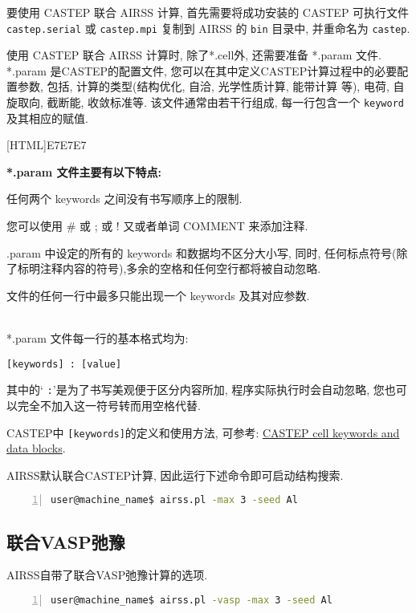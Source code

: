 \documentclass[a4paper, 10pt]{article}
\begin{document}
要使用 CASTEP 联合 AIRSS 计算, 首先需要将成功安装的 CASTEP 可执行文件 \verb|castep.serial| 或 \verb|castep.mpi| 复制到 AIRSS 的 \verb|bin| 目录中, 并重命名为 \verb|castep|.

使用 CASTEP 联合 AIRSS 计算时, 除了*.cell外, 还需要准备 *.param 文件. *.param 是CASTEP的配置文件, 您可以在其中定义CASTEP计算过程中的必要配置参数, 包括, 计算的类型(结构优化, 自洽, 光学性质计算, 能带计算 等), 电荷, 自旋取向, 截断能, 收敛标准等. 该文件通常由若干行组成, 每一行包含一个 \verb|keyword| 及其相应的赋值.

\noindent{}[HTML]{E7E7E7}{\parbox{\textwidth}{%
\noindent \textbf{*.param 文件主要有以下特点:}
\begin{maineu}
\item 任何两个 keywords 之间没有书写顺序上的限制.
\item 您可以使用 \# 或 ; 或 ! 又或者单词 COMMENT 来添加注释.
\item *.param 中设定的所有的 keywords 和数据均不区分大小写, 同时, 任何标点符号(除了标明注释内容的符号),多余的空格和任何空行都将被自动忽略.
\item 文件的任何一行中最多只能出现一个 keywords 及其对应参数.
\end{maineu}}}\\

*.param 文件每一行的基本格式均为:
\begin{lstlisting}
[keywords] : [value]
\end{lstlisting}
其中的` \verb|:|'是为了书写美观便于区分内容所加, 程序实际执行时会自动忽略, 您也可以完全不加入这一符号转而用空格代替.

CASTEP中 \verb|[keywords]|的定义和使用方法, 可参考: \href{http://www.tcm.phy.cam.ac.uk/castep/documentation/WebHelp/content/modules/castep/keywords/k_main_structure.htm}{CASTEP cell keywords and data blocks}.

AIRSS默认联合CASTEP计算, 因此运行下述命令即可启动结构搜索.
\begin{lstlisting}[language={bash},numbers=left]
user@machine_name$ airss.pl -max 3 -seed Al
\end{lstlisting}

\subsection{联合VASP弛豫}
AIRSS自带了联合VASP弛豫计算的选项. 
\begin{lstlisting}[language={bash},numbers=left]
user@machine_name$ airss.pl -vasp -max 3 -seed Al
\end{lstlisting}
\end{document}
